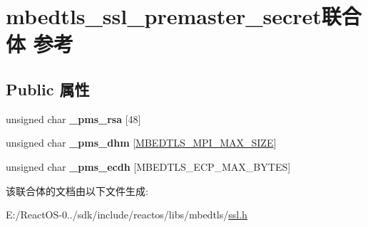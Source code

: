 \hypertarget{unionmbedtls__ssl__premaster__secret}{}\section{mbedtls\+\_\+ssl\+\_\+premaster\+\_\+secret联合体 参考}
\label{unionmbedtls__ssl__premaster__secret}
\subsection*{Public 属性}
\begin{DoxyCompactItemize}
\item 
\mbox{\label{unionmbedtls__ssl__premaster__secret_aa81cb4c88b891c552a5382460eb32f94}} 
unsigned char {\bfseries \+\_\+pms\+\_\+rsa} \mbox{[}48\mbox{]}
\item 
\mbox{\label{unionmbedtls__ssl__premaster__secret_a4d40cce21beb555ce7c4064bf330237c}} 
unsigned char {\bfseries \+\_\+pms\+\_\+dhm} \mbox{[}\hyperlink{bignum_8h_a02bfffc46b7b2e10c0080d29bb56e6b0}{M\+B\+E\+D\+T\+L\+S\+\_\+\+M\+P\+I\+\_\+\+M\+A\+X\+\_\+\+S\+I\+ZE}\mbox{]}
\item 
\mbox{\label{unionmbedtls__ssl__premaster__secret_af35264f678322dccd349d3486fa3645e}} 
unsigned char {\bfseries \+\_\+pms\+\_\+ecdh} \mbox{[}M\+B\+E\+D\+T\+L\+S\+\_\+\+E\+C\+P\+\_\+\+M\+A\+X\+\_\+\+B\+Y\+T\+ES\mbox{]}
\end{DoxyCompactItemize}


该联合体的文档由以下文件生成\+:\begin{DoxyCompactItemize}
\item 
E\+:/\+React\+O\+S-\/0../sdk/include/reactos/libs/mbedtls/\hyperlink{ssl_8h}{ssl.\+h}\end{DoxyCompactItemize}
